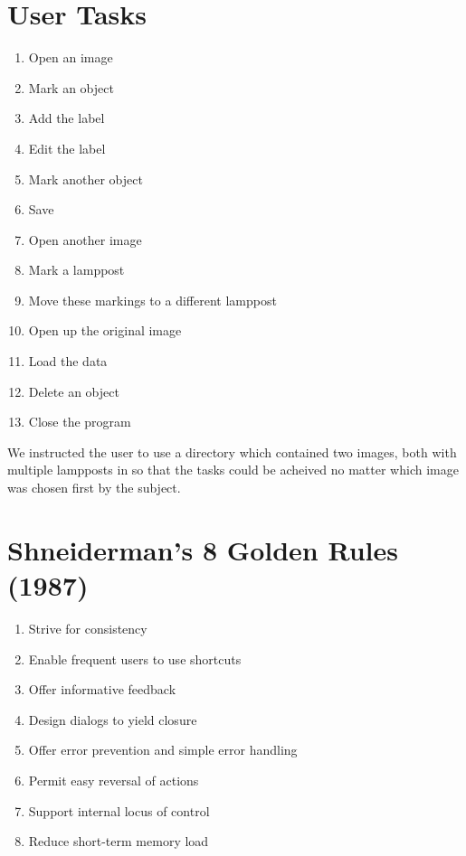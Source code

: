 \documentclass[a4paper,11pt,oneside]{article}
\begin{document}
\section{User Tasks}
\label{sec:tasks}

\begin{enumerate}
    \item Open an image
    \item Mark an object
    \item Add the label
    \item Edit the label
    \item Mark another object
    \item Save
    \item Open another image
    \item Mark a lamppost
    \item Move these markings to a different lamppost
    \item Open up the original image
    \item Load the data
    \item Delete an object
    \item Close the program
\end{enumerate}

We instructed the user to use a directory which contained two images, both with multiple lampposts in so that the tasks could be acheived no matter which image was chosen first by the subject.

\section{Shneiderman’s 8 Golden Rules (1987)}
\label{sec:s_rules}
\begin{enumerate}
    \item Strive for consistency
    \item Enable frequent users to use shortcuts
    \item Offer informative feedback
    \item Design dialogs to yield closure
    \item Offer error prevention and simple error handling
    \item Permit easy reversal of actions
    \item Support internal locus of control
    \item Reduce short-term memory load 
\end{enumerate}
\end{document}
